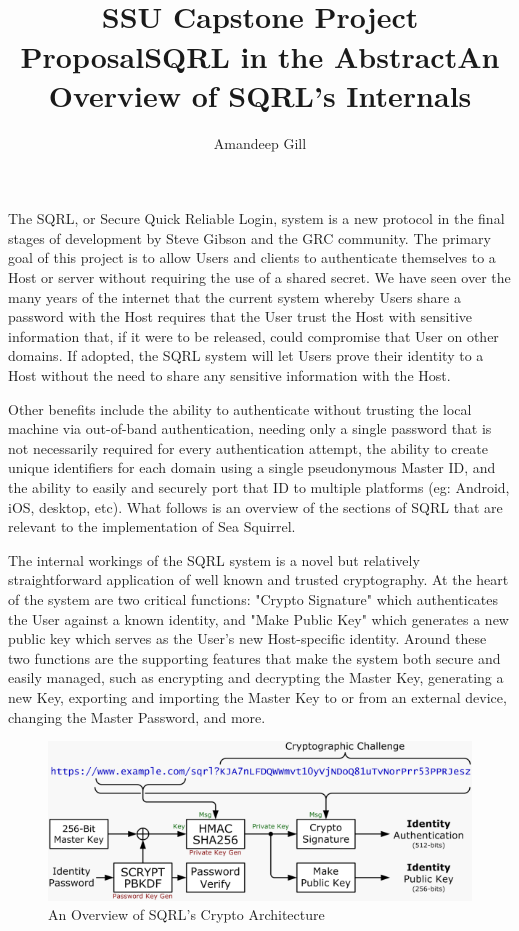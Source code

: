 \documentclass[12pt,twoside]{article}
\title{\textbf{\doctitle}\\
SSU Capstone Project Proposal}
\author{Amandeep Gill}
\begin{document}
\thispagestyle{empty}

\maketitle

\title{\textbf{SQRL in the Abstract}}

The SQRL, or Secure Quick Reliable Login, system is a new protocol in the final stages of development by Steve Gibson and the GRC community. The primary goal of this project is to allow Users and clients to authenticate themselves to a Host or server without requiring the use of a shared secret. We have seen over the many years of the internet that the current system whereby Users share a password with the Host requires that the User trust the Host with sensitive information that, if it were to be released, could compromise that User on other domains. If adopted, the SQRL system will let Users prove their identity to a Host without the need to share any sensitive information with the Host. 

Other benefits include the ability to authenticate without trusting the local machine via out-of-band authentication, needing only a single password that is not necessarily required for every authentication attempt, the ability to create unique identifiers for each domain using a single pseudonymous Master ID, and the ability to easily and securely port that ID to multiple platforms (eg: Android, iOS, desktop, etc). What follows is an overview of the sections of SQRL that are relevant to the implementation of Sea Squirrel.
\\

\title{\textbf{An Overview of SQRL's Internals}}

The internal workings of the SQRL system is a novel but relatively straightforward application of well known and trusted cryptography. At the heart of the system are two critical functions: "Crypto Signature" which authenticates the User against a known identity, and "Make Public Key" which generates a new public key which serves as the User's new Host-specific identity. Around these two functions are the supporting features that make the system both secure and easily managed, such as encrypting and decrypting the Master Key, generating a new Key, exporting and importing the Master Key to or from an external device, changing the Master Password, and more.

\pagebreak

\begin{figure}[h!]
	\centering
	\includegraphics[width=.6\textwidth]{sqrl-arch.png}
	\caption{An Overview of SQRL's Crypto Architecture}
\end{figure}
\end{document}
